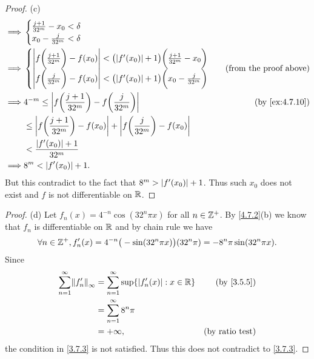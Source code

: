 \begin{proof}{(c)}
\begin{align*}
    \implies & \begin{cases}
                 \frac{j + 1}{32^m} - x_0 < \delta \\
                 x_0 - \frac{j}{32^m} < \delta
               \end{cases}                                                                                                                        \\
    \implies & \begin{cases}
                 \abs{f\bigg(\frac{j + 1}{32^m}\bigg) - f(x_0)} < \big(\abs{f'(x_0)} + 1\big) \bigg(\frac{j + 1}{32^m} - x_0\bigg) \\
                 \abs{f\bigg(\frac{j}{32^m}\bigg) - f(x_0)} < \big(\abs{f'(x_0)} + 1\big) \bigg(x_0 - \frac{j}{32^m}\bigg)
               \end{cases} & \text{(from the proof above)}                                   \\
    \implies & 4^{-m} \leq \abs{f\bigg(\frac{j + 1}{32^m}\bigg) - f\bigg(\frac{j}{32^m}\bigg)}                                           & \text{(by \cref{ex:4.7.10})} \\
             & \leq \abs{f\bigg(\frac{j + 1}{32^m}\bigg) - f(x_0)} + \abs{f\bigg(\frac{j}{32^m}\bigg) - f(x_0)}                                                         \\
             & < \frac{\abs{f'(x_0)} + 1}{32^m}                                                                                                                         \\
    \implies & 8^m < \abs{f'(x_0)} + 1.
  \end{align*}
  But this contradict to the fact that \(8^m > \left\lvert f'(x_0)\right\rvert + 1\).
  Thus such \(x_0\) does not exist and \(f\) is not differentiable on \(\mathbb{R}\).
\end{proof}

\begin{proof}{(d)}
  Let \(f_n(x) = 4^{-n} \cos(32^n \pi x)\) for all \(n \in \mathbb{Z}^+\).
  By \cref{4.7.2}(b) we know that \(f_n\) is differentiable on \(\mathbb{R}\) and by chain rule we have
  \[
    \forall n \in \mathbb{Z}^+, f_n'(x) = 4^{-n} \big(-\sin(32^n \pi x)\big) (32^n \pi) = - 8^n \pi \sin(32^n \pi x).
  \]
  Since
  \begin{align*}
    \sum_{n = 1}^\infty \norm*{f_n'}_\infty & = \sum_{n = 1}^\infty \sup\{\abs{f_n'(x)} : x \in \R\} & \text{(by \cref{3.5.5})} \\
                                            & = \sum_{n = 1}^\infty 8^n \pi                                                     \\
                                            & = +\infty,                                             & \text{(by ratio test)}
  \end{align*}
  the condition in \cref{3.7.3} is not satisfied.
  Thus this does not contradict to \cref{3.7.3}.
\end{proof}